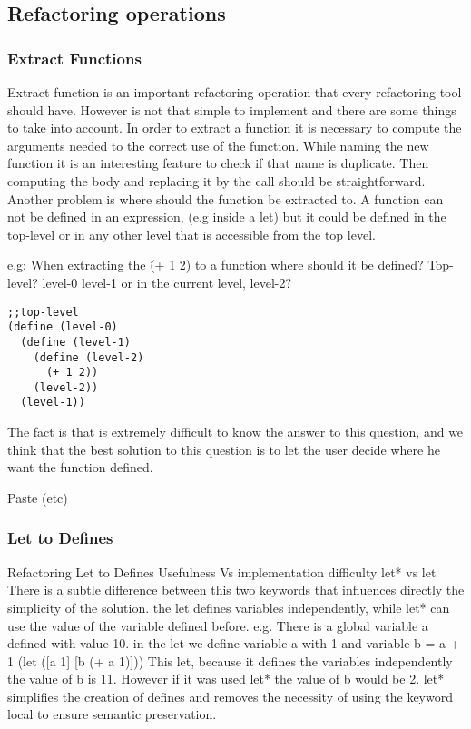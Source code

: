 \subsection{Refactoring operations}

\subsubsection{Extract Functions}
Extract function is an important refactoring operation that every refactoring tool
should have. However is not that simple to implement and there are some things to
take into account.
In order to extract a function it is necessary to compute the arguments needed
to the correct use of the function. While naming the new function it is an interesting
feature to check if that name is duplicate.
Then computing the body and replacing it by the call should be straightforward.
Another problem is where should the function be extracted to. A function can not
be defined in an expression, (e.g inside a let) but it could be defined in the top-level
or in any other level that is accessible from the top level.

e.g: When extracting the \'(+ 1 2) to a function where should it be defined?
Top-level? level-0 level-1 or in the current level, level-2?
\begin{lstlisting}[caption="Example"]
;;top-level
(define (level-0)
  (define (level-1)
    (define (level-2)
      (+ 1 2))
    (level-2))
  (level-1))
\end{lstlisting}

The fact is that is extremely difficult to know the answer to this question, and
we think that the best solution to this question is to let the user decide where
he want the function defined.

Paste (etc)

\subsubsection{Let to Defines}
Refactoring Let to Defines Usefulness Vs implementation difficulty
let* vs let
There is a subtle difference between this two keywords that influences directly the simplicity of the solution.
the let defines variables independently, while let* can use the value of the variable defined before.
e.g.
There is a global variable a defined with value 10.
in the let we define variable a with 1 and variable b = a + 1
(let ([a 1]
[b (+ a 1)]))
This let, because it defines the variables independently the value of b is 11.
However if it was used let* the value of b would be 2.
let* simplifies the creation of defines and removes the necessity of using the keyword local to ensure semantic preservation.

